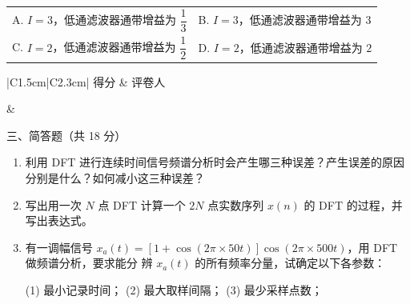 \documentclass[UTF8,a4paper,12pt]{ctexart}
\begin{document}
\begin{enumerate}[label=\arabic*., leftmargin=2em, itemsep=1.8em]
\begin{center}
\begin{tikzpicture}[x=0.72cm,y=0.9cm]
\end{tikzpicture}
\end{center}

\vspace{0.6em}

\begin{tabular}{@{}p{}p{}@{}}
A. $I=3$，低通滤波器通带增益为 $\dfrac{1}{3}$
&
B. $I=3$，低通滤波器通带增益为 $3$
\\[0.8em]
C. $I=2$，低通滤波器通带增益为 $\dfrac{1}{2}$
&
D. $I=2$，低通滤波器通带增益为 $2$
\end{tabular}


\end{enumerate}

\noindent
\begin{minipage}[t]{0.25\textwidth}
\renewcommand{\arraystretch}{1.5}
\begin{tabular}{|C{1.5cm}|C{2.3cm}|}
\hline
得分 & 评卷人 \\
\hline
\rule{0pt}{0.8cm}&  \\
\hline
\end{tabular}
\end{minipage}
\begin{minipage}[t]{0.72\textwidth}
\vspace{0.2cm}
\begin{center}
{\heiti 三、简答题（共 18 分）}
\end{center}
\end{minipage}

\vspace{1.2em}

\begin{enumerate}[label=\arabic*., leftmargin=2em, itemsep=1.2em]

\item 利用 DFT 进行连续时间信号频谱分析时会产生哪三种误差？产生误差的原因分别是什么？如何减小这三种误差？

\newpage

\vspace*{4cm}

\item 写出用一次 $N$ 点 DFT 计算一个 $2N$ 点实数序列 $x(n)$ 的 DFT 的过程，并写出表达式。

\vspace*{5.5cm}

\item 有一调幅信号 $x_a(t) = [1 + \cos(2\pi \times 50t)] \cos(2\pi \times 500t)$，用 DFT 做频谱分析，要求能分
辨 $x_a(t)$ 的所有频率分量，试确定以下各参数：

(1) 最小记录时间； (2) 最大取样间隔； (3) 最少采样点数；

\vspace*{5.5cm}

\end{enumerate}
\end{document}
